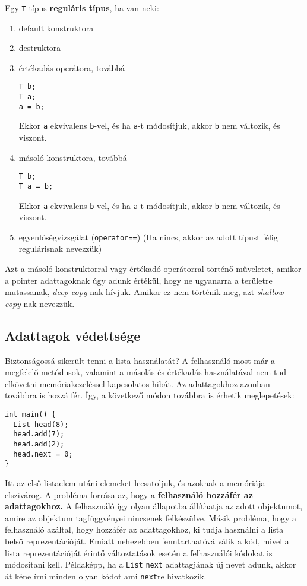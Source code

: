\documentclass[../cpp_book/cpp_book.tex]{subfiles}
\begin{document}
	Egy \texttt{T} típus \textbf{reguláris típus}, ha van neki:
	\begin{enumerate}
		\item default konstruktora
		\item destruktora
		\item értékadás operátora, továbbá
		\begin{lstlisting}
T b;
T a;
a = b;
		\end{lstlisting}
		Ekkor \texttt{a} ekvivalens \texttt{b}-vel, és ha \texttt{a}-t módosítjuk, akkor \texttt{b} nem változik, és viszont.
		\item másoló konstruktora, továbbá
		\begin{lstlisting}
T b;
T a = b;
		\end{lstlisting}
		Ekkor \texttt{a} ekvivalens \texttt{b}-vel, és ha \texttt{a}-t módosítjuk, akkor \texttt{b} nem változik, és viszont.
		\item egyenlőségvizsgálat (\texttt{operator==}) (Ha nincs, akkor az adott típust félig regulárisnak nevezzük)
	\end{enumerate}
	\begin{note}
		Azt a másoló konstruktorral vagy értékadó operátorral történő műveletet, amikor a pointer adattagoknak úgy adunk értékül, hogy ne ugyanarra a területre mutassanak, \textit{deep copy}-nak hívjuk. Amikor ez nem történik meg, azt \textit{shallow copy}-nak nevezzük.
	\end{note}
	\subsection{Adattagok védettsége}
	Biztonságossá sikerült tenni a lista használatát? A felhasználó most már a megfelelő metódusok, valamint a másolás és értékadás használatával nem tud elkövetni memóriakezeléssel kapcsolatos hibát. Az adattagokhoz azonban továbbra is hozzá fér. Így, a következő módon továbbra is érhetik meglepetések:
	\begin{lstlisting}
int main() {
  List head(8);
  head.add(7);
  head.add(2);
  head.next = 0;
}
	\end{lstlisting}
	Itt az első listaelem utáni elemeket lecsatoljuk, és azoknak a memóriája elszivárog. A probléma forrása az, hogy a \textbf{felhasználó hozzáfér az adattagokhoz.} A felhasználó így olyan állapotba állíthatja az adott objektumot, amire az objektum tagfüggvényei nincsenek felkészülve. Másik probléma, hogy a felhasználó azáltal, hogy hozzáfér az adattagokhoz, ki tudja használni a lista belső reprezentációját. Emiatt nehezebben fenntarthatóvá válik a kód, mivel a lista reprezentációját érintő változtatások esetén a felhasználói kódokat is módosítani kell. Példaképp, ha a \texttt{List} \texttt{next} adattagjának új nevet adunk, akkor át kéne írni minden olyan kódot ami \texttt{next}re hivatkozik.
	
\end{document}
